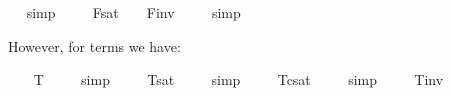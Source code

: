 \begin{isabellebody}
\isadelimproof
\ %
\endisadelimproof
%
\isatagproof
{}\isamarkupfalse%
\ simp\ \isamarkupfalse%
%
\endisatagproof
{\isafoldproof}%
%
\isadelimproof
%
\endisadelimproof
\isanewline
\ \isamarkupfalse%
\ \ {\isachardoublequoteopen}{\isacharbrackleft}{\isasymphi}\isactrlsup F{\isacharbrackright}\isactrlsup s\isactrlsup a\isactrlsup t\ {\isacharequal}\ {\isasymtop}\ {\isasymlongleftrightarrow}\ {\isacharbrackleft}{\isasymphi}\isactrlsup F{\isacharbrackright}\isactrlsup i\isactrlsup n\isactrlsup v\ {\isacharequal}\ {\isasymbottom}{\isachardoublequoteclose}%
\isadelimproof
\ %
\endisadelimproof
%
\isatagproof
{}\isamarkupfalse%
\ simp\ \isamarkupfalse%
%
\endisatagproof
{\isafoldproof}%
%
\isadelimproof
%
\endisadelimproof
%
\begin{isamarkuptext}%
However, for terms we have:%
\end{isamarkuptext}\isamarkuptrue%
\ \isamarkupfalse%
\ \ {\isachardoublequoteopen}{\isacharbrackleft}{\isasymphi}\isactrlsup T{\isacharbrackright}\ {\isacharequal}\ {\isacharasterisk}{\isachardoublequoteclose}%
\isadelimproof
\ %
\endisadelimproof
%
\isatagproof
{}\isamarkupfalse%
\ simp\ \isamarkupfalse%
%
\endisatagproof
{\isafoldproof}%
%
\isadelimproof
%
\endisadelimproof
\isanewline
\ \isamarkupfalse%
\ \ {\isachardoublequoteopen}{\isacharbrackleft}{\isasymphi}\isactrlsup T{\isacharbrackright}\isactrlsup s\isactrlsup a\isactrlsup t\ {\isacharequal}\ {\isacharasterisk}{\isachardoublequoteclose}%
\isadelimproof
\ %
\endisadelimproof
%
\isatagproof
{}\isamarkupfalse%
\ simp\ \isamarkupfalse%
%
\endisatagproof
{\isafoldproof}%
%
\isadelimproof
%
\endisadelimproof
\isanewline
\ \isamarkupfalse%
\ \ {\isachardoublequoteopen}{\isacharbrackleft}{\isasymphi}\isactrlsup T{\isacharbrackright}\isactrlsup c\isactrlsup s\isactrlsup a\isactrlsup t\ {\isacharequal}\ {\isacharasterisk}{\isachardoublequoteclose}%
\isadelimproof
\ %
\endisadelimproof
%
\isatagproof
{}\isamarkupfalse%
\ simp\ \isamarkupfalse%
%
\endisatagproof
{\isafoldproof}%
%
\isadelimproof
%
\endisadelimproof
\isanewline
\ \isamarkupfalse%
\ \ {\isachardoublequoteopen}{\isacharbrackleft}{\isasymphi}\isactrlsup T{\isacharbrackright}\isactrlsup i\isactrlsup n\isactrlsup v\ {\isacharequal}\ {\isacharasterisk}{\isachardoublequoteclose}%
\isadelimproof
\ %
\endisadelimproof
%
\isatagproof
{}\isamarkupfalse%

\end{isabellebody}
